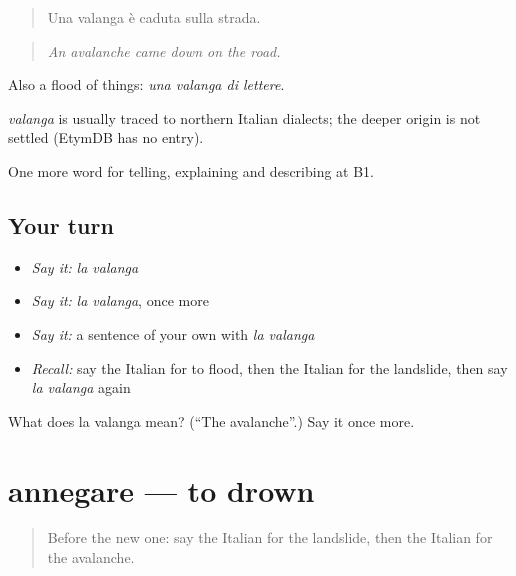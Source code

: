 \begin{quote}
Una valanga è caduta sulla strada.
\end{quote}

\begin{quote}
\emph{An avalanche came down on the road.}
\end{quote}

Also a flood of things: \emph{una valanga di lettere}.

\begin{cousinweb}
\emph{valanga} is usually traced to northern Italian dialects; the deeper origin is not settled (EtymDB has no entry).
\end{cousinweb}

\begin{grammarlens}[title={What you've built}]
One more word for telling, explaining and describing at B1.
\end{grammarlens}

\subsection*{Your turn}
\begin{itemize}
\raggedright
  \item \emph{Say it:} \emph{la valanga}
  \item \emph{Say it:} \emph{la valanga}, once more
  \item \emph{Say it:} a sentence of your own with \emph{la valanga}
  \item \emph{Recall:} say the Italian for to flood, then the Italian for the landslide, then say \emph{la valanga} again
\end{itemize}

\begin{tcolorbox}[breakable,colback=teal!4,colframe=teal!35!black,title={Before you move on}]
What does la valanga mean? (\textquotedblleft{}The avalanche\textquotedblright{}.) Say it once more.
\end{tcolorbox}
\section[annegare]{annegare — to drown}

\label{lesson:IT-C305-annegare}



\begin{quote}
Before the new one: say the Italian for the landslide, then the Italian for the avalanche.
\end{quote}

